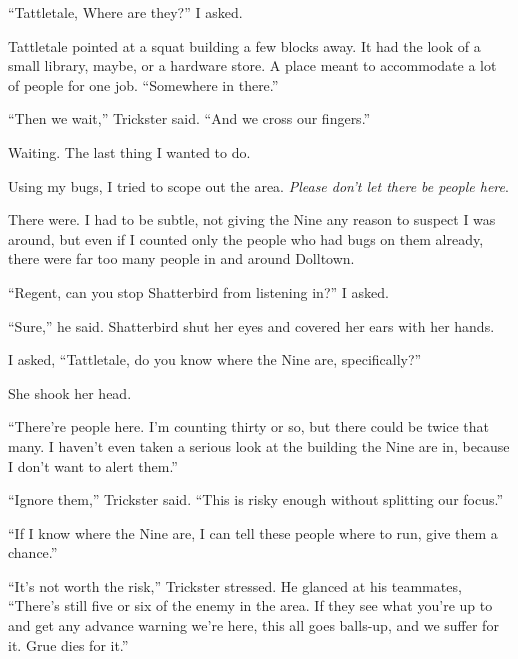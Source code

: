 ``Tattletale, Where are they?'' I asked.



Tattletale pointed at a squat building a few blocks away.  It had the look of a small library, maybe, or a hardware store.  A place meant to accommodate a lot of people for one job. ``Somewhere in there.''



``Then we wait,'' Trickster said.  ``And we cross our fingers.''



Waiting.  The last thing I wanted to do.



Using my bugs, I tried to scope out the area.  \emph{Please don't let there be people here}.



There were.  I had to be subtle, not giving the Nine any reason to suspect I was around, but even if I counted only the people who had bugs on them already, there were far too many people in and around Dolltown.



``Regent, can you stop Shatterbird from listening in?''  I asked.



``Sure,'' he said.  Shatterbird shut her eyes and covered her ears with her hands.



I asked, ``Tattletale, do you know where the Nine are, specifically?''



She shook her head.



``There're people here.  I'm counting thirty or so, but there could be twice that many.  I haven't even taken a serious look at the building the Nine are in, because I don't want to alert them.''



``Ignore them,'' Trickster said.  ``This is risky enough without splitting our focus.''



``If I know where the Nine are, I can tell these people where to run, give them a chance.''



``It's not worth the risk,'' Trickster stressed.  He glanced at his teammates, ``There's still five or six of the enemy in the area.  If they see what you're up to and get any advance warning we're here, this all goes balls-up, and we suffer for it.  Grue dies for it.''



